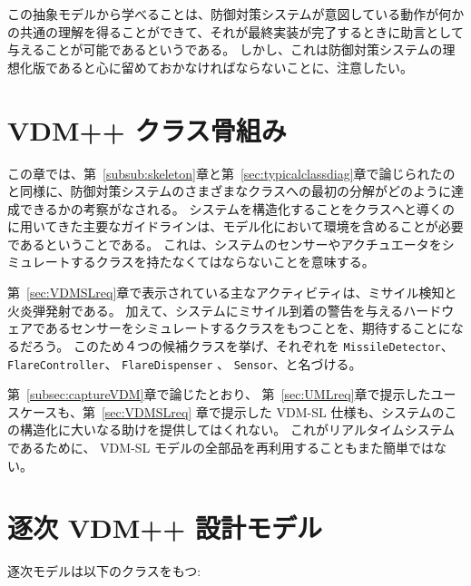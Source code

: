 \documentclass[\pformat,12pt]{jreport}
\begin{document}
この抽象モデルから学べることは、防御対策システムが意図している動作が何かの共通の理解を得ることができて、それが最終実装が完了するときに助言として与えることが可能であるというである。
しかし、これは防御対策システムの理想化版であると心に留めておかなければならないことに、注意したい。

\section{VDM++ クラス骨組み}\label{sec:skeleton}

この章では、第~\ref{subsub:skeleton}章と第~\ref{sec:typicalclassdiag}章で論じられたのと同様に、防御対策システムのさまざまなクラスへの最初の分解がどのように達成できるかの考察がなされる。
システムを構造化することをクラスへと導くのに用いてきた主要なガイドラインは、モデル化において環境を含めることが必要であるということである。
これは、システムのセンサーやアクチュエータをシミュレートするクラスを持たなくてはならないことを意味する。

第~\ref{sec:VDMSLreq}章で表示されている主なアクティビティは、ミサイル検知と火炎弾発射である。
加えて、システムにミサイル到着の警告を与えるハードウェアであるセンサーをシミュレートするクラスをもつことを、期待することになるだろう。
このため４つの候補クラスを挙げ、それぞれを \texttt{MissileDetector}、\texttt{FlareController}、 \texttt{FlareDispenser} 、 \texttt{Sensor}、と名づける。

第~\ref{subsec:captureVDM}章で論じたとおり、 第~\ref{sec:UMLreq}章で提示したユースケースも、第~\ref{sec:VDMSLreq} 章で提示した VDM-SL 仕様も、システムのこの構造化に大いなる助けを提供してはくれない。
これがリアルタイムシステムであるために、 VDM-SL モデルの全部品を再利用することもまた簡単ではない。

\section{逐次 VDM++ 設計モデル}\label{sec:seqVDM}\label{sec:sequential}

逐次モデルは以下のクラスをもつ:
\end{document}
